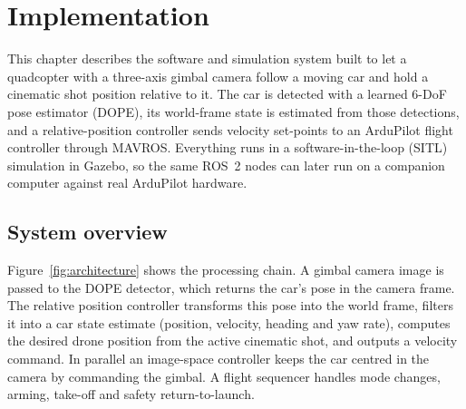 \documentclass[11pt,a4paper]{report}
\begin{document}
\chapter{Implementation}
\label{ch:implementation}

This chapter describes the software and simulation system built to let a
quadcopter with a three-axis gimbal camera follow a moving car and hold a
cinematic shot position relative to it. The car is detected with a learned
6-DoF pose estimator (DOPE), its world-frame state is estimated from those
detections, and a relative-position controller sends velocity set-points to an
ArduPilot flight controller through MAVROS. Everything runs in a
software-in-the-loop (SITL) simulation in Gazebo, so the same ROS~2 nodes can
later run on a companion computer against real ArduPilot hardware.

\section{System overview}
\label{sec:overview}

Figure~\ref{fig:architecture} shows the processing chain. A gimbal camera image
is passed to the DOPE detector, which returns the car's pose in the camera
frame. The relative position controller transforms this pose into the world
frame, filters it into a car state estimate (position, velocity, heading and
yaw rate), computes the desired drone position from the active cinematic shot,
and outputs a velocity command. In parallel an image-space controller keeps the
car centred in the camera by commanding the gimbal. A flight sequencer handles
mode changes, arming, take-off and safety return-to-launch.
\end{document}
